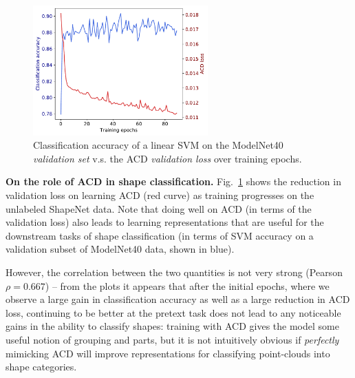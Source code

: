 \begin{figure}
    \centering
    \includegraphics[width=0.6\textwidth]{acd/imgs/train_svm_acd.pdf}
    \caption{\small{Classification accuracy of a linear SVM on the ModelNet40 \emph{validation set} v.s. 
    the ACD \emph{validation loss} over training epochs. 
    }}
    \vspace{-0.5cm}
    \label{fig:acd_loss_svm}
\end{figure}
\vspace{2mm}
\noindent
\textbf{On the role of ACD in shape classification.} 
Fig.~\ref{fig:acd_loss_svm} shows the reduction in validation loss on learning ACD (red curve) as training progresses on the unlabeled ShapeNet data.  Note that doing well on ACD (in terms of the validation loss) also leads to learning representations that are useful for the downstream tasks of shape classification (in terms of SVM accuracy on a validation subset of ModelNet40 data, shown in blue).


%
However, the correlation between the two quantities is not very strong (Pearson $\rho = 0.667$) -- from the plots it appears that after the initial epochs, where we observe a large gain in classification accuracy as well as a large reduction in ACD loss, continuing to be better at the pretext task does not lead to any noticeable gains in the ability to classify shapes: training with ACD gives the model some useful notion of grouping and parts, but it is not intuitively obvious if \textit{perfectly} mimicking ACD will improve representations for classifying point-clouds into shape categories.



